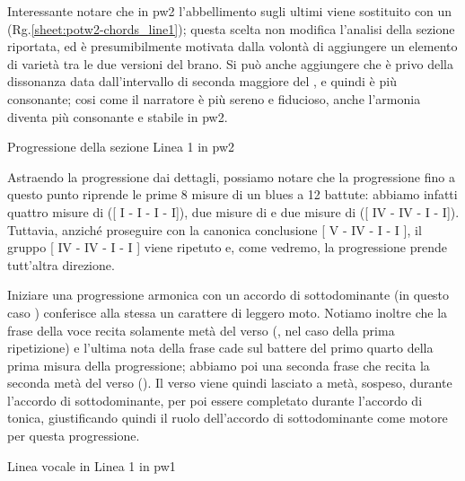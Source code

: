 \documentclass[class=book, crop=false, oneside, 12pt]{standalone}
\begin{document}
    Interessante notare che in \acrshort{pw2} l'abbellimento sugli ultimi  viene sostituito con un  (Rg.\ref{sheet:potw2-chords_line1}); questa scelta non modifica l'analisi della sezione riportata, ed è presumibilmente motivata dalla volontà di aggiungere un elemento di varietà tra le due versioni del brano. Si può anche aggiungere che  è privo della dissonanza data dall'intervallo di seconda maggiore del , e quindi è più consonante; cosi come il narratore  è più sereno e fiducioso, anche l'armonia diventa più consonante e stabile in \acrshort{pw2}.

    \begin{sheet}[htbp]
        \centering
        \caption{Progressione della sezione Linea 1 in \acrshort{pw2}}
        \label{sheet:potw2-chords_line1}
    \end{sheet}
    
    Astraendo la progressione dai dettagli, possiamo notare che la progressione  fino a questo punto riprende le prime 8 misure di un blues a 12 battute: abbiamo infatti quattro misure di  ([ I - I - I - I]), due misure di  e due misure di  ([ IV - IV - I - I]). Tuttavia, anziché proseguire con la canonica conclusione [ V - IV - I - I ], il gruppo [ IV - IV - I - I ] viene ripetuto e, come vedremo, la progressione prende tutt'altra direzione.

    
    Iniziare una progressione armonica con un accordo di sottodominante (in questo caso ) conferisce alla stessa un carattere di leggero moto. Notiamo inoltre che la frase della voce recita solamente metà del verso (, nel caso della prima ripetizione) e l'ultima nota della frase  cade sul battere del primo quarto della prima misura della progressione; abbiamo poi una seconda frase che recita la seconda metà del verso (). Il verso viene quindi lasciato a metà, sospeso, durante l'accordo di sottodominante, per poi essere completato durante l'accordo di tonica, giustificando quindi il ruolo dell'accordo di sottodominante come motore per questa progressione.
    
    \begin{sheet}[htbp]
        \centering
        \caption{Linea vocale in Linea 1 in \acrshort{pw1}}
        \label{sheet:potw1-lyrics_line1}
    \end{sheet}
    
\end{document}
